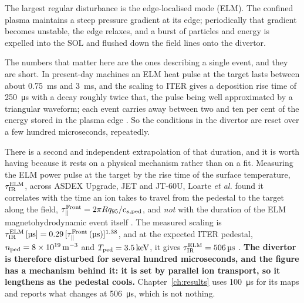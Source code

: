 The largest regular disturbance is the edge-localised mode (ELM). The confined
plasma maintains a steep pressure gradient at its edge; periodically that
gradient becomes unstable, the edge relaxes, and a burst of particles and energy
is expelled into the SOL and flushed down the field lines onto the divertor.

The numbers that matter here are the ones describing a single event, and they are
short. In present-day machines an ELM heat pulse at the target lasts between
about \SI{0.75}{\milli\second} and \SI{3}{\milli\second}, and the scaling to
ITER gives a deposition rise time of \SI{250}{\micro\second} with a decay
roughly twice that, the pulse being well approximated by a triangular waveform;
each event carries away between two and ten per cent of the energy stored in the
plasma edge \cite{Eich2017}. So the conditions in the divertor are reset over a
few hundred microseconds, repeatedly.

There is a second and independent extrapolation of that duration, and it is
worth having because it rests on a physical mechanism rather than on a fit.
Measuring the ELM power pulse at the target by the rise time of the surface
temperature, $\tau^{\rm ELM}_{\rm IR}$, across ASDEX Upgrade, JET and JT-60U,
Loarte \emph{et al.} found it correlates with the time an ion takes to travel
from the pedestal to the target along the field,
$\tau^{\rm Front}_\parallel = 2\pi R q_{95}/c_{s,\rm ped}$, and \emph{not} with
the duration of the ELM magnetohydrodynamic event itself
\cite[Sec.~4]{Loarte2003}. The measured scaling is
$\tau^{\rm ELM}_{\rm IR}\,[\si{\micro\second}]
= 0.29\,[\tau^{\rm Front}_\parallel\,(\si{\micro\second})]^{1.38}$, and at the
expected ITER pedestal, $n_{\rm ped} = \SI{8e19}{\per\cubic\metre}$ and
$T_{\rm ped} = \SI{3.5}{\kilo\electronvolt}$, it gives
$\tau^{\rm ELM}_{\rm IR} = \SI{506}{\micro\second}$
\cite[Sec.~5]{Loarte2003}. \textbf{The divertor is therefore disturbed for
several hundred microseconds, and the figure has a mechanism behind it: it is
set by parallel ion transport, so it lengthens as the pedestal cools.}
Chapter~\ref{ch:results} uses \SI{100}{\micro\second} for its maps and reports
what changes at \SI{506}{\micro\second}, which is not nothing.

